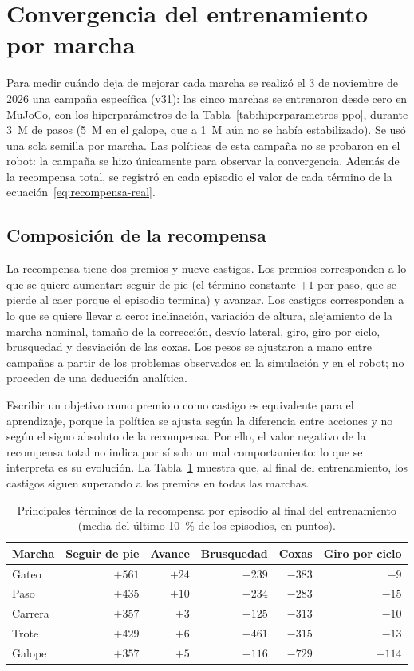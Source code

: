 \section{Convergencia del entrenamiento por marcha}
\label{sec:convergencia-marchas}

Para medir cuándo deja de mejorar cada marcha se realizó el 3 de noviembre de 2026
una campaña específica (v31): las cinco marchas se entrenaron desde cero en MuJoCo,
con los hiperparámetros de la Tabla~\ref{tab:hiperparametros-ppo}, durante 3~M de pasos
(5~M en el galope, que a 1~M aún no se había estabilizado). Se usó una sola semilla por
marcha. Las políticas de esta campaña no se probaron en el robot: la campaña se
hizo únicamente para observar la convergencia. Además de la recompensa total, se
registró en cada episodio el valor de cada término de la
ecuación~\eqref{eq:recompensa-real}.

\subsection{Composición de la recompensa}

La recompensa tiene dos premios y nueve castigos. Los premios corresponden a lo que se
quiere aumentar: seguir de pie (el término constante $+1$ por paso, que se pierde al
caer porque el episodio termina) y avanzar. Los castigos corresponden a lo que se quiere
llevar a cero: inclinación, variación de altura, alejamiento de la marcha nominal, tamaño
de la corrección, desvío lateral, giro, giro por ciclo, brusquedad y desviación de las
coxas. Los pesos se ajustaron a mano entre campañas a partir de los problemas observados
en la simulación y en el robot; no proceden de una deducción analítica.

Escribir un objetivo como premio o como castigo es equivalente para el aprendizaje,
porque la política se ajusta según la diferencia entre acciones y no según el signo
absoluto de la recompensa. Por ello, el valor negativo de la recompensa total no indica
por sí solo un mal comportamiento: lo que se interpreta es su evolución. La
Tabla~\ref{tab:terminos-recompensa} muestra que, al final del entrenamiento, los castigos
siguen superando a los premios en todas las marchas.

\begin{table}[H]
\centering
\caption{Principales términos de la recompensa por episodio al final del entrenamiento (media del último 10~\% de los episodios, en puntos).}
\label{tab:terminos-recompensa}
\small
\begin{tabular}{lrrrrr}
\toprule
Marcha & Seguir de pie & Avance & Brusquedad & Coxas & Giro por ciclo \\
\midrule
Gateo & $+561$ & $+24$ & $-239$ & $-383$ & $-9$ \\
Paso & $+435$ & $+10$ & $-234$ & $-283$ & $-15$ \\
Carrera & $+357$ & $+3$ & $-125$ & $-313$ & $-10$ \\
Trote & $+429$ & $+6$ & $-461$ & $-315$ & $-13$ \\
Galope & $+357$ & $+5$ & $-116$ & $-729$ & $-114$ \\
\bottomrule
\end{tabular}
\end{table}

